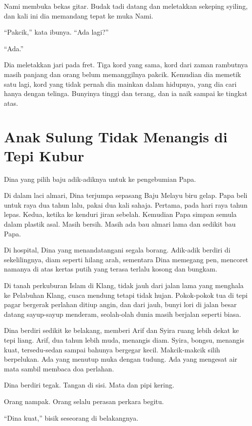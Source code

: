 \documentclass[
  11pt,
  a5paper,
  openany,
  oneside]{book}
\begin{document}
Nami membuka bekas gitar. Budak tadi datang dan meletakkan sekeping
syiling, dan kali ini dia memandang tepat ke muka Nami.

``Pakcik,'' kata ibunya. ``Ada lagi?''

``Ada.''

Dia meletakkan jari pada fret. Tiga kord yang sama, kord dari zaman
rambutnya masih panjang dan orang belum memanggilnya pakcik. Kemudian
dia memetik satu lagi, kord yang tidak pernah dia mainkan dalam
hidupnya, yang dia cari hanya dengan telinga. Bunyinya tinggi dan
terang, dan ia naik sampai ke tingkat atas.

\chapter{Anak Sulung Tidak Menangis di Tepi
Kubur}\label{anak-sulung-tidak-menangis-di-tepi-kubur}

Dina yang pilih baju adik-adiknya untuk ke pengebumian Papa.

Di dalam laci almari, Dina terjumpa sepasang Baju Melayu biru gelap.
Papa beli untuk raya dua tahun lalu, pakai dua kali sahaja. Pertama,
pada hari raya tahun lepas. Kedua, ketika ke kenduri jiran sebelah.
Kemudian Papa simpan semula dalam plastik asal. Masih bersih. Masih ada
bau almari lama dan sedikit bau Papa.

Di hospital, Dina yang menandatangani segala borang. Adik-adik berdiri
di sekelilingnya, diam seperti hilang arah, sementara Dina memegang pen,
mencoret namanya di atas kertas putih yang terasa terlalu kosong dan
bungkam.

Di tanah perkuburan Islam di Klang, tidak jauh dari jalan lama yang
menghala ke Pelabuhan Klang, cuaca mendung tetapi tidak hujan.
Pokok-pokok tua di tepi pagar bergerak perlahan ditiup angin, dan dari
jauh, bunyi lori di jalan besar datang sayup-sayup menderam, seolah-olah
dunia masih berjalan seperti biasa.

Dina berdiri sedikit ke belakang, memberi Arif dan Syira ruang lebih
dekat ke tepi liang. Arif, dua tahun lebih muda, menangis diam. Syira,
bongsu, menangis kuat, tersedu-sedan sampai bahunya bergegar kecil.
Makcik-makcik silih berpelukan. Ada yang menutup muka dengan tudung. Ada
yang mengesat air mata sambil membaca doa perlahan.

Dina berdiri tegak. Tangan di sisi. Mata dan pipi kering.

Orang nampak. Orang selalu perasan perkara begitu.

``Dina kuat,'' bisik seseorang di belakangnya.
\end{document}
